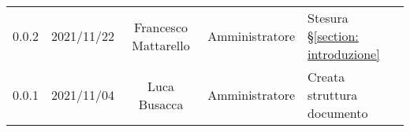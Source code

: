 \begin{center}
\begin{longtable}[c]{c | c | c | c | p{5cm}}
		0.0.2                                                      & 2021/11/22 & Francesco Mattarello & Amministratore & Stesura §\ref{section: introduzione}                                                                                                      \\
		0.0.1                                                      & 2021/11/04 & Luca Busacca         & Amministratore & Creata struttura documento                                                                                                                \\
	\end{longtable}
\end{center}
